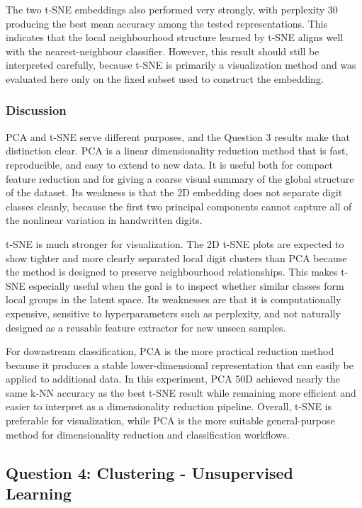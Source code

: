 \documentclass[11pt]{article}
\begin{document}
The two t-SNE embeddings also performed very strongly, with perplexity 30 producing the best mean accuracy among the tested representations. This indicates that the local neighbourhood structure learned by t-SNE aligns well with the nearest-neighbour classifier. However, this result should still be interpreted carefully, because t-SNE is primarily a visualization method and was evaluated here only on the fixed subset used to construct the embedding.

\subsubsection{Discussion}

PCA and t-SNE serve different purposes, and the Question 3 results make that distinction clear. PCA is a linear dimensionality reduction method that is fast, reproducible, and easy to extend to new data. It is useful both for compact feature reduction and for giving a coarse visual summary of the global structure of the dataset. Its weakness is that the 2D embedding does not separate digit classes cleanly, because the first two principal components cannot capture all of the nonlinear variation in handwritten digits.

t-SNE is much stronger for visualization. The 2D t-SNE plots are expected to show tighter and more clearly separated local digit clusters than PCA because the method is designed to preserve neighbourhood relationships. This makes t-SNE especially useful when the goal is to inspect whether similar classes form local groups in the latent space. Its weaknesses are that it is computationally expensive, sensitive to hyperparameters such as perplexity, and not naturally designed as a reusable feature extractor for new unseen samples.

For downstream classification, PCA is the more practical reduction method because it produces a stable lower-dimensional representation that can easily be applied to additional data. In this experiment, PCA 50D achieved nearly the same k-NN accuracy as the best t-SNE result while remaining more efficient and easier to interpret as a dimensionality reduction pipeline. Overall, t-SNE is preferable for visualization, while PCA is the more suitable general-purpose method for dimensionality reduction and classification workflows.

\subsection{Question 4: Clustering - Unsupervised Learning}
\end{document}
